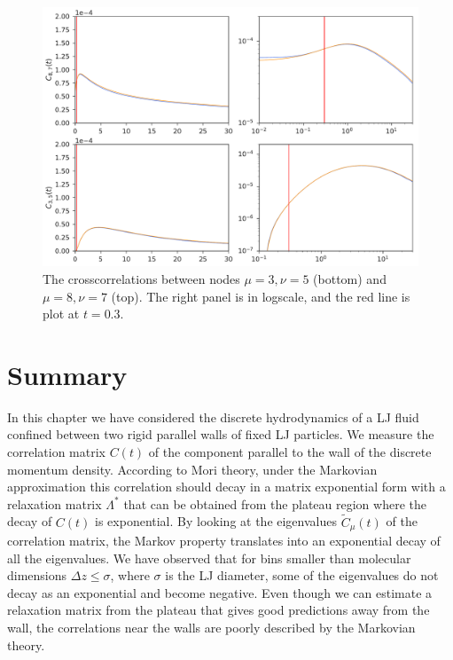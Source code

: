 \documentclass[b5paper,openright,10pt]{book}
\begin{document}
\newpage
\begin{figure}[h!]
  \centering
\includegraphics[width=\linewidth]{PredictionsCross-WALLS-17nodes}
\caption[Predicted crosscorrelations of $C(t)$ for a confined fluid - Thick bins]{The crosscorrelations between nodes $\mu=3,\nu=5$ (bottom) and  $\mu=8,\nu=7$ (top). The right panel is in logscale, and the red line is plot at $t=0.3$.}
\label{fig:PredictionsCross-WALLS-17nodes}
\end{figure}

\section{Summary}
In this chapter we have considered  the discrete hydrodynamics of  a LJ
fluid  confined  between   two  rigid  parallel  walls   of  fixed  LJ
particles. We  measure the correlation  matrix $C(t)$ of
the component parallel to the wall of the discrete momentum density.  According
to  Mori theory,  under the  Markovian approximation  this correlation
should decay  in a  matrix exponential form  with a  relaxation matrix
$\Lambda^*$ that  can be  obtained from the  plateau region  where the
decay  of  $C(t)$  is  exponential.  By  looking  at  the  eigenvalues
$\tilde{C}_\mu(t)$  of the  correlation  matrix,  the Markov  property
translates into an  exponential decay of all the  eigenvalues. We have
observed that  for bins  smaller than  molecular dimensions  $\Delta z
\leq  \sigma$,  where  $\sigma$  is  the  LJ  diameter,  some  of  the
eigenvalues do  not decay  as an exponential  and become  negative.  Even
though we can estimate a relaxation matrix from the plateau that gives
good predictions away  from the wall, the correlations  near the walls
are poorly described by the Markovian theory.
\end{document}
